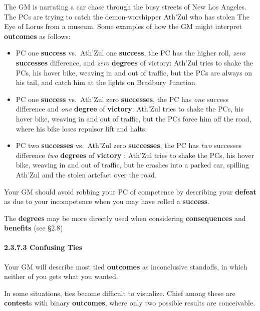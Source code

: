 \documentclass[
  11pt,
]{article}
\providecommand{\tightlist}{%
  \setlength{\itemsep}{0pt}\setlength{\parskip}{0pt}}
\begin{document}
The GM is narrating a car chase through the busy streets of New Los
Angeles. The PCs are trying to catch the demon-worshipper Ath'Zul who
has stolen The Eye of Lorus from a museum. Some examples of how the GM
might interpret \textbf{outcomes} as follows:

\begin{itemize}
\tightlist
\item
  PC one \textbf{success} vs.~Ath'Zul one \textbf{success}, the PC has
  the higher roll, \emph{zero} \textbf{successes} difference, and
  \emph{zero} \textbf{degrees} of victory: Ath'Zul tries to shake the
  PCs, his hover bike, weaving in and out of traffic, but the PCs are
  always on his tail, and catch him at the lights on Bradbury Junction.
\item
  PC one \textbf{success} vs.~Ath'Zul zero \textbf{successes}, the PC
  has \emph{one} success difference and \emph{one} \textbf{degree} of
  \textbf{victory}: Ath'Zul tries to shake the PCs, his hover bike,
  weaving in and out of traffic, but the PCs force him off the road,
  where his bike loses repulsor lift and halts.
\item
  PC two \textbf{successes} vs.~Ath'Zul zero \textbf{successes}, the PC
  has \emph{two} successes difference \emph{two} \textbf{degrees} of
  \textbf{victory} : Ath'Zul tries to shake the PCs, his hover bike,
  weaving in and out of traffic, but he crashes into a parked car,
  spilling Ath'Zul and the stolen artefact over the road.
\end{itemize}

Your GM should avoid robbing your PC of competence by describing your
\textbf{defeat} as due to your incompetence when you may have rolled a
\textbf{success}.

The \textbf{degrees} may be more directly used when considering
\textbf{consequences} and \textbf{benefits} (see §2.8)

\hypertarget{confusing-ties}{%
\paragraph{2.3.7.3 Confusing Ties}\label{confusing-ties}}

Your GM will describe most tied \textbf{outcomes} as inconclusive
standoffs, in which neither of you gets what you wanted.

In some situations, ties become difficult to visualize. Chief among
these are \textbf{contest}s with binary \textbf{outcomes}, where only
two possible results are conceivable.
\end{document}
